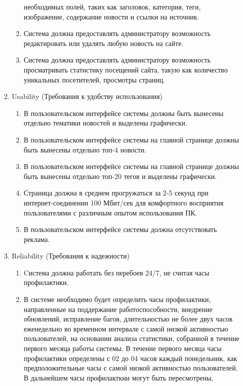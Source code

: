 \begin{enumerate}
\begin{enumerate}[label=3.\arabic*]
\begin{enumerate}[label=3.1.\arabic*]
            необходимых полей, таких как заголовок, категория, теги, изображение, содержание новости и ссылки на источник.
            \item Система должна предоставлять администратору возможность редактировать или удалять любую новость на сайте.
            \item Система должна предоставлять администратору возможность просматривать статистику посещений сайта, такую как количество уникальных посетителей, просмотры страниц.
        \end{enumerate}
        \BgThispage
        \item Usability (Требования к удобству использования)
        \begin{enumerate}[label=3.2.\arabic*]
            \item В пользовательском интерфейсе системы должны быть вынесены отдельно тематики новостей и выделены графически.
            \item В пользовательском интерфейсе системы на главной странице должны быть вынесены отдельно топ-4 новости.
            \item В пользовательском интерфейсе системы на главной странице должны быть вынесены отдельно топ-20 тегов и выделены графически.
            \item Страница должна в среднем прогружаться за 2-5 секунд при интернет-соединении 100 Мбит/сек для комфортного восприятия
            пользователями с различным опытом использования ПК.
            \item В пользовательском интерфейсе системы должна отсутствовать реклама.
        \end{enumerate}
        \newpage
        \item Reliability (Требования к надежности)
        \begin{enumerate}[label=3.3.\arabic*]
            \item Cистема должна работать без перебоев 24/7, не считая часы профилактики.
            \item В системе необходимо будет определить часы профилактики, направленные на поддержание работоспособности,
            внедрение обновлений, исправление багов, длительностью не более двух часов еженедельно во временном
            интервале с самой низкой активностью пользователей, на основании анализа статистики, собранной в течение
            первого месяца работы системы. В течение первого месяца часы профилактики определены с 02 до 04 часов каждый понедельник,
            как предположительные часы с самой низкой активностью пользователей. В дальнейшем часы профилакткии могут быть пересмотрены,

\end{enumerate}
\end{enumerate}
\end{enumerate}
